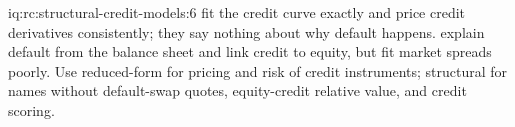 \begin{solution}{iq:rc:structural-credit-models:6}
 fit the credit curve exactly and price credit derivatives
consistently; they say nothing about why default happens.  explain
default from the balance sheet and link credit to equity, but fit market spreads poorly.
Use reduced-form for pricing and risk of credit instruments; structural for names
without default-swap quotes, equity-credit relative value, and credit scoring.
\end{solution}
